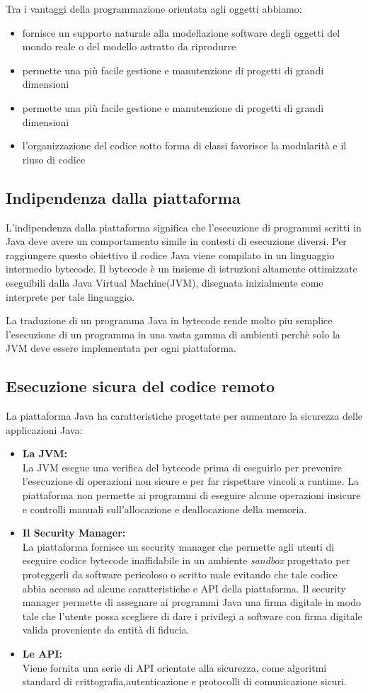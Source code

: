 Tra i vantaggi della programmazione orientata agli oggetti abbiamo:
\begin{itemize}
\item fornisce un supporto naturale alla modellazione software degli oggetti del mondo reale o del modello astratto da riprodurre
\item permette una pi\`u facile gestione e manutenzione di progetti di grandi dimensioni
\item permette una pi\`u facile gestione e manutenzione di progetti di grandi dimensioni
\item l'organizzazione del codice sotto forma di classi favorisce la modularit\`a e il riuso di codice
\end{itemize}
\subsection*{Indipendenza dalla piattaforma}
L'indipendenza dalla piattaforma significa che l’esecuzione di programmi scritti  in  Java  deve  avere  un  comportamento  simile 
in contesti di esecuzione diversi. Per raggiungere questo obiettivo il codice Java viene compilato in un linguaggio intermedio bytecode. Il bytecode \`e un insieme di istruzioni altamente ottimizzate eseguibili dalla Java Virtual Machine(JVM), disegnata inizialmente come interprete per tale linguaggio.

La traduzione di un programma Java in bytecode rende molto piu semplice l'esecuzione di un programma in una vasta gamma di ambienti perch\`e solo la JVM deve essere implementata per ogni piattaforma.
\subsection*{Esecuzione sicura del codice remoto}
La piattaforma Java ha caratteristiche progettate per aumentare la sicurezza delle applicazioni Java:
\begin{itemize}
\item \textbf{La JVM:}\\
La JVM esegue una verifica del bytecode prima di eseguirlo per prevenire l'esecuzione di operazioni non sicure e per far rispettare vincoli a runtime. La piattaforma non permette ai programmi di eseguire alcune operazioni insicure e controlli manuali sull'allocazione e deallocazione della memoria.
\item \textbf{Il Security Manager:}\\
La piattaforma fornisce un security manager che permette agli utenti di eseguire codice bytecode inaffidabile in un ambiente \textit{sandbox} progettato per proteggerli da software pericoloso o scritto male evitando che tale codice abbia accesso ad alcune caratteristiche e API della piattaforma.
Il security manager permette di assegnare ai programmi Java una firma digitale in modo tale che l'utente possa scegliere di dare i privilegi a software con firma digitale valida proveniente da entità di fiducia.
\item \textbf{Le API:}\\
Viene fornita una serie di API orientate alla sicurezza, come algoritmi standard di crittografia,autenticazione e protocolli di comunicazione sicuri.
\end{itemize}


